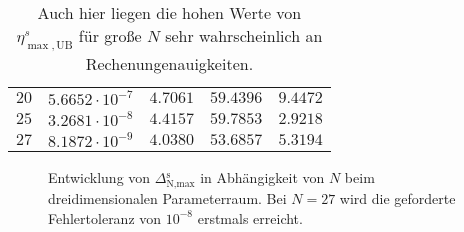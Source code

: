 \begin{table}[h]
\begin{center}
\begin{tabular}{r|llll}
            $20$ & $5.6652 \cdot 10^{-7}$ & $4.7061$ & $59.4396$ & $9.4472$ \\
            $25$ & $3.2681 \cdot 10^{-8}$ & $4.4157$ & $59.7853$ & $2.9218$ \\
            $27$ & $8.1872 \cdot 10^{-9}$ & $4.0380$ & $53.6857$ & $5.3194$
        \end{tabular}
        \caption{Auch hier liegen die hohen Werte von $\eta^s_{\max,\text{UB}}$ für große $N$ sehr wahrscheinlich an Rechenungenauigkeiten.}
        \label{tab:dreidim}
    \end{center}
\end{table}

\begin{figure}[tb]
    \begin{center}
        \small
        \setlength\figureheight{6cm}
        \setlength{}
        
    \end{center}
    \caption{Entwicklung von $\Delta{}^\text{s}_{\text{N,max}}$ in Abhängigkeit von $N$ beim dreidimensionalen Parameterraum. Bei $N = 27$ wird die geforderte Fehlertoleranz von $10^{-8}$ erstmals erreicht.}
    \label{fig:3par_plot_fehler_nach_N}
\end{figure}



